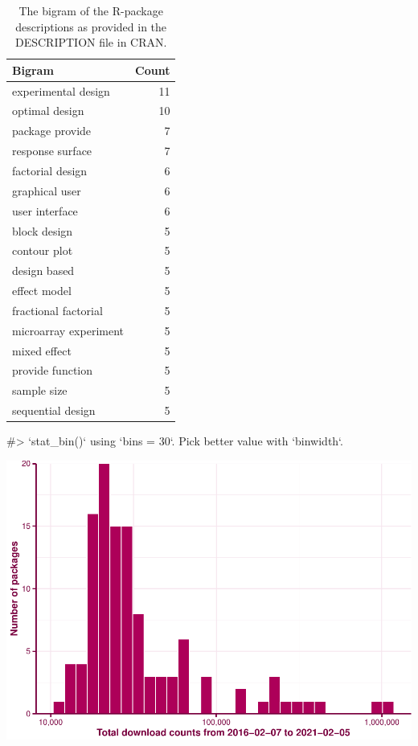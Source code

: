 \begin{Schunk}
\begin{table}

\caption{\label{tab:bigram-desc}The bigram of the R-package descriptions as provided in the DESCRIPTION file in CRAN.}
\centering
\begin{tabular}[t]{lr}
\toprule
Bigram & Count\\
\midrule
experimental design & 11\\
optimal design & 10\\
package provide & 7\\
response surface & 7\\
factorial design & 6\\
\addlinespace
graphical user & 6\\
user interface & 6\\
block design & 5\\
contour plot & 5\\
design based & 5\\
\addlinespace
effect model & 5\\
fractional factorial & 5\\
microarray experiment & 5\\
mixed effect & 5\\
provide function & 5\\
\addlinespace
sample size & 5\\
sequential design & 5\\
\bottomrule
\end{tabular}
\end{table}

\end{Schunk}

\begin{Schunk}
\begin{Soutput}
#> `stat_bin()` using `bins = 30`. Pick better value with `binwidth`.
\end{Soutput}


\begin{center}\includegraphics{paper_files/figure-latex/download-hist-1} \end{center}

\end{Schunk}

